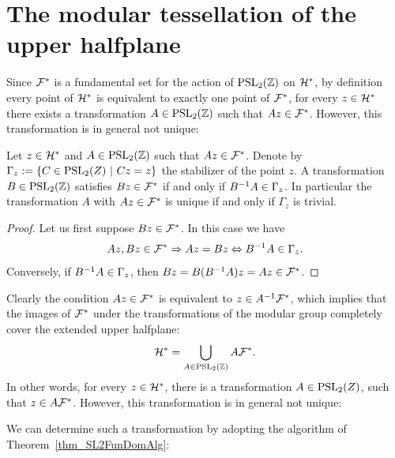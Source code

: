 \section{The modular tessellation of the upper halfplane}

Since $\mathcal{F}^\ast$ is a fundamental set for the action of $\operatorname{PSL}_{2}(\mathbb{Z})$ on $\mathcal{H}^\ast$, by definition every point of $\mathcal{H}^\ast$ is equivalent to exactly one point of $\mathcal{F}^\ast$, \ie for every $z \in \mathcal{H}^\ast$ there exists a transformation $A \in \operatorname{PSL}_{2}(\mathbb{Z})$ such that $Az \in \mathcal{F}^\ast$. However, this transformation is in general not unique:

\begin{lemma}
Let $z \in \mathcal{H}^\ast$ and $A \in \operatorname{PSL}_{2}(\mathbb{Z})$ such that $Az \in \mathcal{F}^\ast$. Denote by $\Gamma_z := \{ C \in \operatorname{PSL}_{2}(Z) \ | \ Cz = z \}$ the stabilizer of the point $z$. A transformation $B \in \operatorname{PSL}_{2}(\mathbb{Z})$ satisfies $Bz \in \mathcal{F}^\ast$ if and only if ${B}^{-1}A \in \Gamma_z$. In particular the transformation $A$ with $Az \in \mathcal{F}^\ast$ is unique if and only if $\Gamma_z$ is trivial.
\end{lemma}
\begin{proof}
Let us first suppose $Bz \in \mathcal{F}^\ast$. In this case we have
\begin{equation*}
Az, Bz \in \mathcal{F}^\ast \Rightarrow Az = Bz \Leftrightarrow {B}^{-1}A \in \Gamma_z.
\end{equation*}
Conversely, if ${B}^{-1}A \in \Gamma_z$, then $Bz = B({B}^{-1}A)z = Az \in \mathcal{F}^\ast$. 
\end{proof}

Clearly the condition $Az \in \mathcal{F}^\ast$ is equivalent to $z \in {A}^{-1} \mathcal{F}^\ast$, which implies that the images of $\mathcal{F}^\ast$ under the transformations of the modular group completely cover the extended upper halfplane:
\begin{equation}
\label{eqn_EUCovering}
\mathcal{H}^\ast = \bigcup_{A \in \operatorname{PSL}_{2}(\mathbb{Z})} A \mathcal{F}^\ast.
\end{equation}
In other words, for every $z \in \mathcal{H}^\ast$, there is a transformation $A \in \operatorname{PSL}_{2}(Z)$, such that $z \in A \mathcal{F}^\ast$. However, this transformation is in general not unique: 

We can determine such a transformation by adopting the algorithm of Theorem~\ref{thm_SL2FunDomAlg}:

